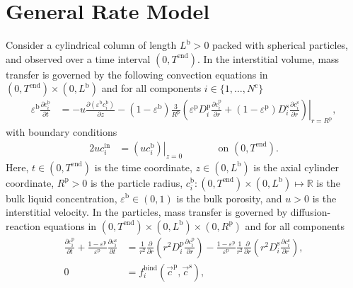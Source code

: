 \documentclass{article}
\begin{document}
\section*{General Rate Model}
Consider a cylindrical column of length $L^{\mathrm{b}} > 0$ packed with spherical particles, and observed over a time interval $(0, T^{\mathrm{end}})$.
In the interstitial volume, mass transfer is governed by the following convection equations in $(0, T^{\mathrm{end}})\times (0, L^{\mathrm{b}})$ and for all components $i\in\{1, \dots, N^{\mathrm{c}} \}$
\begin{align}
    \varepsilon^{\mathrm{b}} \frac{\partial c^{\mathrm{b}}_{i}}{\partial t}
    &= - u \frac{\partial \left( \varepsilon^{\mathrm{b}} c^{\mathrm{b}}_{i} \right)}{\partial z}
        - \left(1 - \varepsilon^{\mathrm{b}} \right) \frac{3}{R^{\mathrm{p}}} \left( \varepsilon^{\mathrm{p}} D^{\mathrm{p}}_{i} \left. \frac{\partial c^{\mathrm{p}}_{i}}{\partial r} + (1 - \varepsilon^{\mathrm{p}}) D^{\mathrm{s}}_{i} \frac{\partial c^{\mathrm{s}}_{i}}{\partial r}\right)\right|_{r = R^{\mathrm{p}}},
\end{align}
with boundary conditions
\begin{alignat}{2}
    u c^{\mathrm{in}}_{i}
    &= \left.\left( u c^{\mathrm{b}}_{i} \right)\right|_{z=0}
    & & \qquad\text{on }(0, T^{\mathrm{end}}).
\end{alignat}
Here, $t\in (0, T^{\mathrm{end}})$ is the time coordinate, $z\in (0, L^{\mathrm{b}})$ is the axial cylinder coordinate, $R^{\mathrm{p}}> 0$ is the particle radius, $c^{\mathrm{b}}_{i}\colon (0, T^{\mathrm{end}})\times (0, L^{\mathrm{b}}) \mapsto \mathbb{R}$ is the bulk liquid concentration, $\varepsilon^{\mathrm{b}}\in (0, 1)$ is the bulk porosity, and $u> 0$ is the interstitial velocity.
In the particles, mass transfer is governed by diffusion-reaction equations in $(0, T^{\mathrm{end}}) \times (0, L^{\mathrm{b}})\times (0, R^{\mathrm{p}})$ and for all components
\begin{align}
    \frac{\partial c^{\mathrm{p}}_{i}}{\partial t}
        + \frac{1 - \varepsilon^{\mathrm{p}}}{\varepsilon^{\mathrm{p}}} \frac{\partial c^{\mathrm{s}}_{i}}{\partial t}
    &= \frac{1}{r^{2}} \frac{\partial }{\partial r} \left( r^{2} D^{\mathrm{p}}_{i} \frac{\partial c^{\mathrm{p}}_{i}}{\partial r} \right)
        - \frac{1 - \varepsilon^{\mathrm{p}}}{\varepsilon^{\mathrm{p}}} \frac{1}{r^{2}} \frac{\partial }{\partial r} \left( r^{2} D^{\mathrm{s}}_{i} \frac{\partial c^{\mathrm{s}}_{i}}{\partial r} \right),
    \\
    0
    &= f^{\mathrm{bind}}_{i}\left( \vec{c}^{\mathrm{p}}, \vec{c}^{\mathrm{s}} \right),
\end{align}
\end{document}
